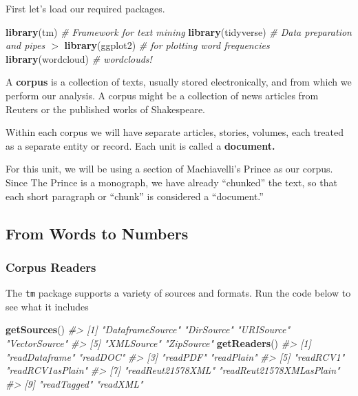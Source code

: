 \documentclass[]{book}
\newenvironment{Shaded}{\begin{snugshade}}{\end{snugshade}}
\newcommand{\CommentTok}[1]{\textcolor[rgb]{0.56,0.35,0.01}{\textit{#1}}}
\newcommand{\KeywordTok}[1]{\textcolor[rgb]{0.13,0.29,0.53}{\textbf{#1}}}
\newcommand{\NormalTok}[1]{#1}
\begin{document}
First let's load our required packages.

\begin{Shaded}
\begin{Highlighting}[]
\KeywordTok{library}\NormalTok{(tm) }\CommentTok{# Framework for text mining}
\KeywordTok{library}\NormalTok{(tidyverse) }\CommentTok{# Data preparation and pipes $>$}
\KeywordTok{library}\NormalTok{(ggplot2) }\CommentTok{# for plotting word frequencies}
\KeywordTok{library}\NormalTok{(wordcloud) }\CommentTok{# wordclouds!}
\end{Highlighting}
\end{Shaded}

A \textbf{corpus} is a collection of texts, usually stored electronically, and from which we perform our analysis. A corpus might be a collection of news articles from Reuters or the published works of Shakespeare.

Within each corpus we will have separate articles, stories, volumes, each treated as a separate entity or record. Each unit is called a \textbf{document.}

For this unit, we will be using a section of Machiavelli's Prince as our corpus. Since The Prince is a monograph, we have already ``chunked'' the text, so that each short paragraph or ``chunk'' is considered a ``document.''

\hypertarget{from-words-to-numbers}{%
\subsection{From Words to Numbers}\label{from-words-to-numbers}}

\hypertarget{corpus-readers}{%
\subsubsection*{Corpus Readers}\label{corpus-readers}}

The \texttt{tm} package supports a variety of sources and formats. Run the code below to see what it includes

\begin{Shaded}
\begin{Highlighting}[]
\KeywordTok{getSources}\NormalTok{()}
\CommentTok{#> [1] "DataframeSource" "DirSource"       "URISource"       "VectorSource"   }
\CommentTok{#> [5] "XMLSource"       "ZipSource"}
\KeywordTok{getReaders}\NormalTok{()}
\CommentTok{#>  [1] "readDataframe"           "readDOC"                }
\CommentTok{#>  [3] "readPDF"                 "readPlain"              }
\CommentTok{#>  [5] "readRCV1"                "readRCV1asPlain"        }
\CommentTok{#>  [7] "readReut21578XML"        "readReut21578XMLasPlain"}
\CommentTok{#>  [9] "readTagged"              "readXML"}
\end{Highlighting}
\end{Shaded}
\end{document}
